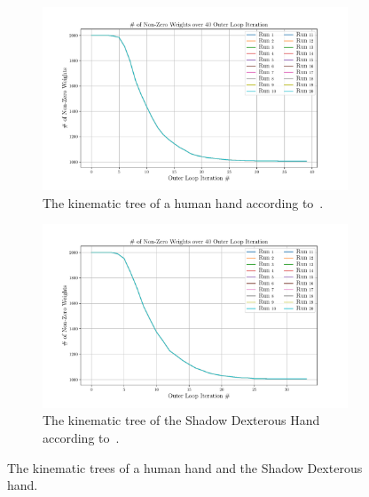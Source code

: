 \begin{figure}[!h]
	\centering
	\begin{subfigure}[b]{0.48\textwidth}
		\centering
		\includegraphics[width=\textwidth]{chapters/2-pose-estimation/fig/GNC-TLS-w-run-70-conv.pdf}
		\caption{The kinematic tree of a human hand according to~\cite{grasp-synthesis-algorithms-for-multifingered-robot-hands}.}
		\label{app:GNC-TLS-w-run-70-conv}
	\end{subfigure}
	\hfill
	\begin{subfigure}[b]{0.48\textwidth}
		\centering
		\includegraphics[width=\textwidth]{chapters/2-pose-estimation/fig/GNC-TLS-w-run-80-conv.pdf}
		\caption{The kinematic tree of the Shadow Dexterous Hand according to~\cite{robot-hand-kinematics}. \newline}
		\label{app:GNC-TLS-w-run-80-conv}
	\end{subfigure}
	\caption{The kinematic trees of a human hand and the Shadow Dexterous hand.}
	\label{app:GNC-TLS-w-run-70-80-conv}
\end{figure}

